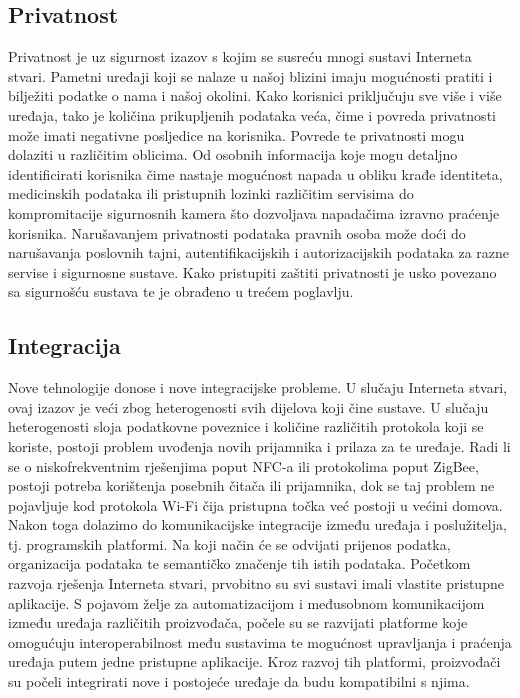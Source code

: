\documentclass[times, utf8, diplomski]{fer}
\begin{document}
\subsection{Privatnost}
Privatnost je uz sigurnost izazov s kojim se susreću mnogi sustavi Interneta stvari. Pametni uređaji koji se nalaze u našoj blizini imaju mogućnosti pratiti i bilježiti podatke o nama i našoj okolini. Kako korisnici priključuju sve više i više uređaja, tako je količina prikupljenih podataka veća, čime i povreda privatnosti može imati negativne posljedice na korisnika. Povrede te privatnosti mogu dolaziti u različitim oblicima. Od osobnih informacija koje mogu detaljno identificirati korisnika čime nastaje mogućnost napada u obliku krađe identiteta, medicinskih podataka ili pristupnih lozinki različitim servisima do kompromitacije sigurnosnih kamera što dozvoljava napadačima izravno praćenje korisnika. Narušavanjem privatnosti podataka pravnih osoba može doći do narušavanja poslovnih tajni, autentifikacijskih i autorizacijskih podataka za razne servise i sigurnosne sustave. Kako pristupiti zaštiti privatnosti je usko povezano sa sigurnošću sustava te je obrađeno u trećem poglavlju.

\subsection{Integracija}
Nove tehnologije donose i nove integracijske probleme. U slučaju Interneta stvari, ovaj izazov je veći zbog heterogenosti svih dijelova koji čine sustave. U slučaju heterogenosti sloja podatkovne poveznice i količine različitih protokola koji se koriste, postoji problem uvođenja novih prijamnika i prilaza za te uređaje. Radi li se o niskofrekventnim rješenjima poput NFC-a ili protokolima poput ZigBee, postoji potreba korištenja posebnih čitača ili prijamnika, dok se taj problem ne pojavljuje kod protokola Wi-Fi čija pristupna točka već postoji u većini domova. Nakon toga dolazimo do komunikacijske integracije između uređaja i poslužitelja, tj. programskih platformi. Na koji način će se odvijati prijenos podatka, organizacija podataka te semantičko značenje tih istih podataka. Početkom razvoja rješenja Interneta stvari, prvobitno su svi sustavi imali vlastite pristupne aplikacije. S pojavom želje za automatizacijom i međusobnom komunikacijom između uređaja različitih proizvođača, počele su se razvijati platforme koje omogućuju interoperabilnost među sustavima te mogućnost upravljanja i praćenja uređaja putem jedne pristupne aplikacije. Kroz razvoj tih platformi, proizvođači su počeli integrirati nove i postojeće uređaje da budu kompatibilni s njima.
\end{document}
